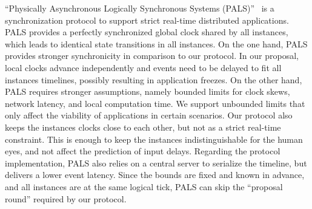 \documentclass[sigplan,screen]{acmart}
\begin{document}
``Physically Asynchronous Logically Synchronous Systems (PALS)''~\cite{gals.pals}
is a synchronization protocol to support strict real-time distributed
applications.
PALS provides a perfectly synchronized global clock shared by all instances,
which leads to identical state transitions in all instances.
%
On the one hand, PALS provides stronger synchronicity in comparison to our
protocol.
In our proposal, local clocks advance independently and events need to be
delayed to fit all instances timelines, possibly resulting in application
freezes.
%
On the other hand, PALS requires stronger assumptions, namely bounded limits
for clock skews, network latency, and local computation time.
We support unbounded limits that only affect the viability of applications in
certain scenarios.
%
Our protocol also keeps the instances clocks close to each other, but not as a
strict real-time constraint.
This is enough to keep the instances indistinguishable for the human eyes, and
not affect the prediction of input delays.
%
Regarding the protocol implementation, PALS also relies on a central server to
serialize the timeline, but delivers a lower event latency.
Since the bounds are fixed and known in advance, and all instances are
at the same logical tick, PALS can skip the ``proposal round'' required by our
protocol.
\end{document}
